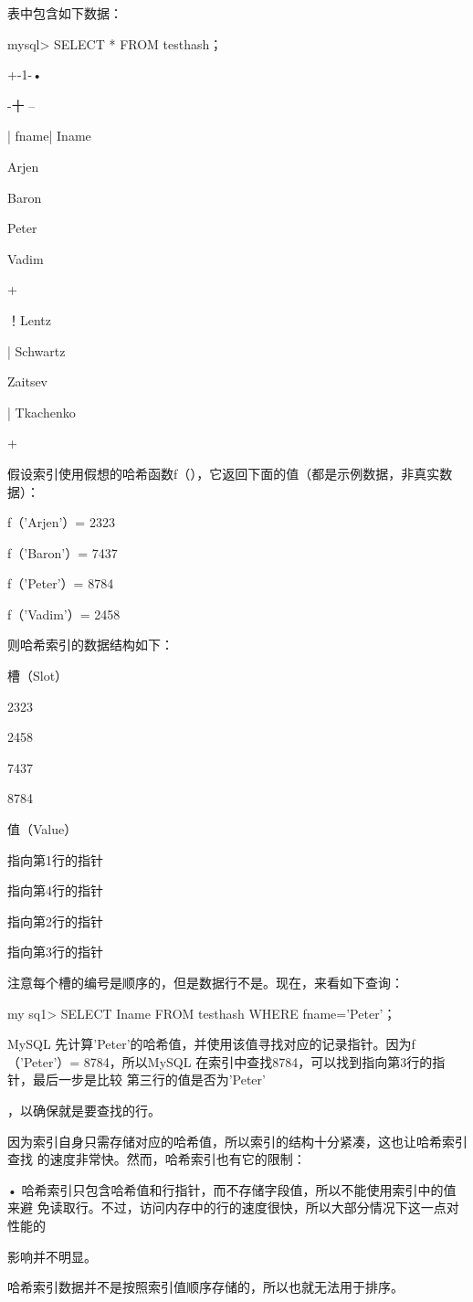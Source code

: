 表中包含如下数据：

mysql> SELECT * FROM testhash；

+-1-•

-十 --

| fname| Iname

Arjen

Baron

Peter

Vadim

+

！Lentz

| Schwartz

Zaitsev

| Tkachenko

+

假设索引使用假想的哈希函数f（），它返回下面的值（都是示例数据，非真实数据）：

f（'Arjen'）= 2323

f（'Baron'）= 7437

f（'Peter'）= 8784

f（'Vadim'）= 2458

则哈希索引的数据结构如下：

槽（Slot）

2323

2458

7437

8784

值（Value）

指向第1行的指针

指向第4行的指针

指向第2行的指针

指向第3行的指针

注意每个槽的编号是顺序的，但是数据行不是。现在，来看如下查询：

my sq1> SELECT Iname FROM testhash WHERE fname='Peter'；

MySQL 先计算'Peter'的哈希值，并使用该值寻找对应的记录指针。因为f（'Peter'）=
8784，所以MySQL 在索引中查找8784，可以找到指向第3行的指针，最后一步是比较
第三行的值是否为'Peter'

，以确保就是要查找的行。

因为索引自身只需存储对应的哈希值，所以索引的结构十分紧凑，这也让哈希索引查找
的速度非常快。然而，哈希索引也有它的限制：

• 哈希索引只包含哈希值和行指针，而不存储字段值，所以不能使用索引中的值来避
免读取行。不过，访问内存中的行的速度很快，所以大部分情况下这一点对性能的

影响并不明显。

哈希索引数据并不是按照索引值顺序存储的，所以也就无法用于排序。

